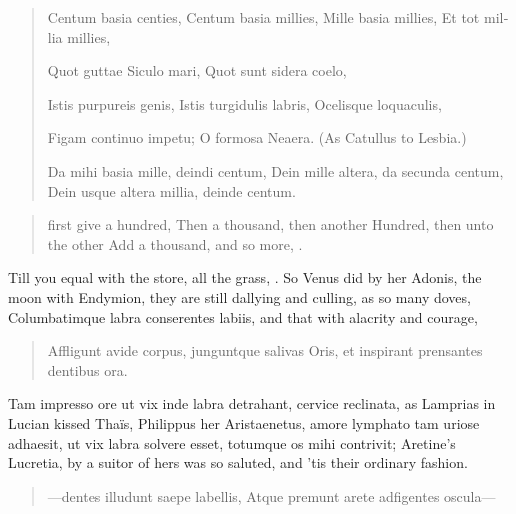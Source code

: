 \begin{latin}
\begin{verse}
Centum basia centies,
Centum basia millies,
Mille basia millies,
Et tot millia millies,

Quot guttae Siculo mari,
Quot sunt sidera coelo,

Istis purpureis genis,
Istis turgidulis labris,
Ocelisque loquaculis,

Figam continuo impetu;
O formosa Neaera. \textenglish{(As Catullus to Lesbia.)}

Da mihi basia mille, deindi centum,
Dein mille altera, da secunda centum,
Dein usque altera millia, deinde centum.
\end{verse}
\end{latin}

\begin{verse}%
first give a hundred,
Then a thousand, then another
Hundred, then unto the other
Add a thousand, and so more, \etc{}.
\end{verse}%

Till you equal with the store, all the grass, \etc{}. So Venus did by her
Adonis, the moon with Endymion, they are still dallying and culling, as
so many doves, Columbatimque labra conserentes labiis, and that with
alacrity and courage,

\begin{latin}
\begin{verse}
Affligunt avide corpus, junguntque salivas
Oris, et inspirant prensantes dentibus ora.
\end{verse}
\end{latin}

Tam impresso ore ut vix inde labra detrahant, cervice reclinata,
as Lamprias in Lucian kissed Thaïs, Philippus her Aristaenetus,
amore lymphato tam uriose adhaesit, ut vix labra solvere esset,
totumque os mihi contrivit; Aretine's Lucretia, by a suitor of
hers was so saluted, and 'tis their ordinary fashion.

\begin{latin}
\begin{verse}
---dentes illudunt saepe labellis,
Atque premunt arete adfigentes oscula---
\end{verse}
\end{latin}


